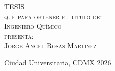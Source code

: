 \begin{titlepage}
\begin{minipage}[c][0.81\textheight][t]{0.75\textwidth}
\begin{center}
            \textsc{\LARGE T\hspace{1.5cm}E\hspace{1.5cm}S\hspace{1.5cm}I\hspace{1.5cm}S}\\[0.5cm]
            \textsc{\large que para obtener el t\'itulo de:}\\[0.5cm]
            \textsc{\large Ingeniero Químico}\\[0.5cm]
            \textsc{\large presenta:}\\[0.5cm]
            \textsc{\large {Jorge Angel Rosas Martínez}}\\[2cm]          

            \vspace{0.5cm}


            \vspace{0.5cm}

            \large{Ciudad Universitaria, CDMX}{ }{2026}
        \end{center}
    \end{minipage}
\end{titlepage}

